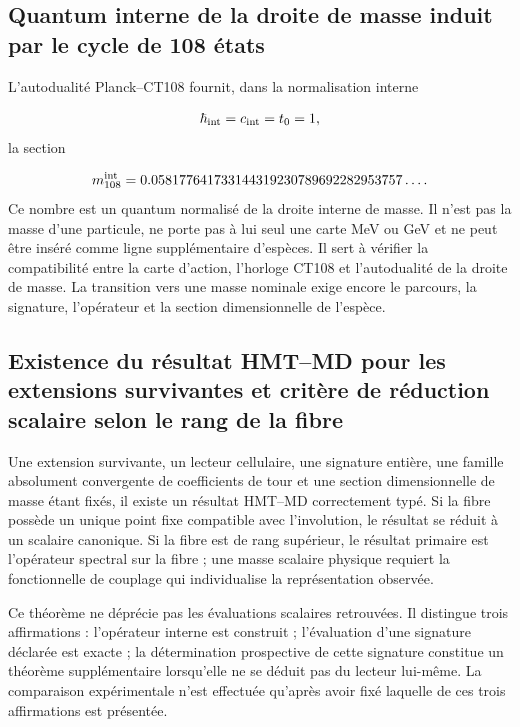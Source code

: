 \subsection{Quantum interne de la droite de masse induit par le cycle de 108 états}
L'autodualité Planck--CT108 fournit, dans la normalisation interne

\[
\hbar_{\rm int}=c_{\rm int}=t_0=1,
\]
la section

\[
m_{108}^{\rm int}
=0.058177641733144319230789692282953757\ldots .
\]
Ce nombre est un quantum normalisé de la droite interne de masse. Il n'est pas la masse d'une particule, ne porte pas à lui seul une carte MeV ou GeV et ne peut être inséré comme ligne supplémentaire d'espèces. Il sert à vérifier la compatibilité entre la carte d'action, l'horloge CT108 et l'autodualité de la droite de masse. La transition vers une masse nominale exige encore le parcours, la signature, l'opérateur et la section dimensionnelle de l'espèce.

\subsection{Existence du résultat HMT–MD pour les extensions survivantes et critère de réduction scalaire selon le rang de la fibre}
Une extension survivante, un lecteur cellulaire, une signature entière, une famille absolument convergente de coefficients de tour et une section dimensionnelle de masse étant fixés, il existe un résultat HMT--MD correctement typé. Si la fibre possède un unique point fixe compatible avec l'involution, le résultat se réduit à un scalaire canonique. Si la fibre est de rang supérieur, le résultat primaire est l'opérateur spectral sur la fibre ; une masse scalaire physique requiert la fonctionnelle de couplage qui individualise la représentation observée.

Ce théorème ne déprécie pas les évaluations scalaires retrouvées. Il distingue trois affirmations : l'opérateur interne est construit ; l'évaluation d'une signature déclarée est exacte ; la détermination prospective de cette signature constitue un théorème supplémentaire lorsqu'elle ne se déduit pas du lecteur lui-même. La comparaison expérimentale n'est effectuée qu'après avoir fixé laquelle de ces trois affirmations est présentée.

